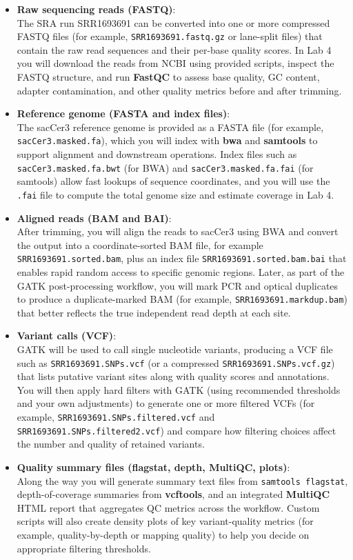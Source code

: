 \documentclass[
  letterpaper,
  DIV=11,
  numbers=noendperiod]{scrreprt}
\begin{document}
\begin{itemize}
\item
  \textbf{Raw sequencing reads (FASTQ)}:\\
  The SRA run SRR1693691 can be converted into one or more compressed
  FASTQ files (for example, \texttt{SRR1693691.fastq.gz} or lane-split
  files) that contain the raw read sequences and their per-base quality
  scores. In Lab 4 you will download the reads from NCBI using provided
  scripts, inspect the FASTQ structure, and run \textbf{FastQC} to
  assess base quality, GC content, adapter contamination, and other
  quality metrics before and after trimming.
\item
  \textbf{Reference genome (FASTA and index files)}:\\
  The sacCer3 reference genome is provided as a FASTA file (for example,
  \texttt{sacCer3.masked.fa}), which you will index with \textbf{bwa}
  and \textbf{samtools} to support alignment and downstream operations.
  Index files such as \texttt{sacCer3.masked.fa.bwt} (for BWA) and
  \texttt{sacCer3.masked.fa.fai} (for samtools) allow fast lookups of
  sequence coordinates, and you will use the \texttt{.fai} file to
  compute the total genome size and estimate coverage in Lab 4.
\item
  \textbf{Aligned reads (BAM and BAI)}:\\
  After trimming, you will align the reads to sacCer3 using BWA and
  convert the output into a coordinate-sorted BAM file, for example
  \texttt{SRR1693691.sorted.bam}, plus an index file
  \texttt{SRR1693691.sorted.bam.bai} that enables rapid random access to
  specific genomic regions. Later, as part of the GATK post-processing
  workflow, you will mark PCR and optical duplicates to produce a
  duplicate-marked BAM (for example, \texttt{SRR1693691.markdup.bam})
  that better reflects the true independent read depth at each site.
\item
  \textbf{Variant calls (VCF)}:\\
  GATK will be used to call single nucleotide variants, producing a VCF
  file such as \texttt{SRR1693691.SNPs.vcf} (or a compressed
  \texttt{SRR1693691.SNPs.vcf.gz}) that lists putative variant sites
  along with quality scores and annotations. You will then apply hard
  filters with GATK (using recommended thresholds and your own
  adjustments) to generate one or more filtered VCFs (for example,
  \texttt{SRR1693691.SNPs.filtered.vcf} and
  \texttt{SRR1693691.SNPs.filtered2.vcf}) and compare how filtering
  choices affect the number and quality of retained variants.
\item
  \textbf{Quality summary files (flagstat, depth, MultiQC, plots)}:\\
  Along the way you will generate summary text files from
  \texttt{samtools\ flagstat}, depth-of-coverage summaries from
  \textbf{vcftools}, and an integrated \textbf{MultiQC} HTML report that
  aggregates QC metrics across the workflow. Custom scripts will also
  create density plots of key variant-quality metrics (for example,
  quality-by-depth or mapping quality) to help you decide on appropriate
  filtering thresholds.
\end{itemize}
\end{document}
